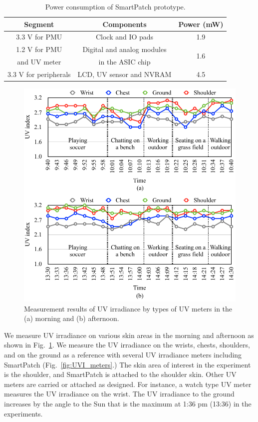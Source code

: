 \documentclass[journal]{IEEEtran}
\begin{document}
\begin{table}
\centering
\caption{Power consumption of SmartPatch prototype.}
\label{table:power_summary}
\begin{tabular}{|c|c|c|}  \hline
Segment 			&Components					&Power (mW)	\\ \hline \hline
3.3 V for PMU		&Clock and IO pads			&1.9	\\ \hline
1.2 V for PMU 		&Digital and analog modules		&\multirow{2}{*}{1.6}		\\
and UV meter 	&in the ASIC chip 				&\\ \hline
3.3 V for peripherals & LCD, UV sensor and NVRAM	&4.5 \\ \hline

\end{tabular}
\end{table}

\begin{figure}
\centering
\includegraphics[width=1.0\hsize]{Figures/UV_measure.pdf}
\caption{Measurement results of UV irradiance by types of UV meters in the (a) morning and (b) afternoon.}
\label{fig:UV_measure}
\end{figure}      

We measure UV irradiance on various skin areas in the morning and afternoon as shown in Fig.~\ref{fig:UV_measure}.
We measure the UV irradiance on the wrists, chests, shoulders, and on the ground as a reference with several UV irradiance meters including SmartPatch (Fig.~\ref{fig:UVI_meters}.)
The skin area of interest in the experiment is the shoulder, and SmartPatch is attached to the shoulder skin. Other UV meters are carried or attached as designed.
For instance, a watch type UV meter measures the UV irradiance on the wrist.
The UV irradiance to the ground increases by the angle to the Sun that is the maximum at 1:36 pm (13:36) in the experiments.
\end{document}
